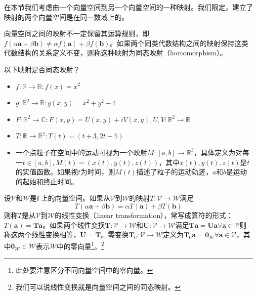 \documentclass[main.tex]{subfiles}
\begin{document}
在本节我们考虑由一个向量空间到另一个向量空间的一种映射。我们限定，建立了映射的两个向量空间是在同一数域上的。

向量空间之间的映射不一定保留其运算规则，即$f\left(\alpha\mathbf{a}+\beta\mathbf{b}\right)\neq\alpha f\left(\mathbf{a}\right)+\beta f\left(\mathbf{b}\right)$。如果两个同类代数结构之间的映射保持这类代数结构的关系定义不变，则称这种映射为同态映射（homomorphism）。
\begin{example}
以下映射是否同态映射？
\begin{itemize}
    \item $f:\mathbb{R}\rightarrow\mathbb{R}:f\left(x\right)=x^2$
    \item $g:\mathbb{R}^2\rightarrow\mathbb{R}:g\left(x,y\right)=x^2+y^2-4$
    \item $F:\mathbb{R}^2\rightarrow\mathbb{C}:F\left(x,y\right)=U\left(x,y\right)+iV\left(x,y\right),U,V:\mathbb{R}^2\rightarrow\mathbb{R}$
    \item $T:\mathbb{R}\rightarrow\mathbb{R}^2:T\left(t\right)=\left(t+3,2t-5\right)$
    \item 一个点粒子在空间中的运动可视为一个映射$M:\left[a,b\right]\rightarrow\mathbb{R}^3$，具体定义为对每一$t\in\left[a,b\right],M\left(t\right)=\left(x\left(t\right),y\left(t\right),z\left(t\right)\right)$，其中$x\left(t\right),y\left(t\right),z\left(t\right)$是$t$的实值函数。如果视$t$为时间，则$M\left(t\right)$描述了粒子的运动轨迹，$a$和$b$是运动的起始和终止时间。
\end{itemize}
\end{example}

\begin{definition}[线性变换]\label{def:II.4.1}
设$\mathcal{V}$和$\mathcal{W}$是$\mathbb{F}$上的向量空间。如果从$\mathcal{V}$到$\mathcal{W}$的映射$T:\mathcal{V}\rightarrow\mathcal{W}$满足
\[T\left(\alpha\mathbf{a}+\beta\mathbf{b}\right)=\alpha T\left(\mathbf{a}\right)+\beta T\left(\mathbf{b}\right)\]
则称$T$是从$\mathcal{V}$到$\mathcal{W}$的线性变换（linear transformation），常写成算符的形式：$T\left(\mathbf{a}\right)=\mathbf{Ta}$。如果两个线性变换$\mathbf{T}:\mathcal{V}\rightarrow\mathcal{W}$和$\mathbf{U}:\mathcal{V}\rightarrow\mathcal{W}$满足$\mathbf{Ta}=\mathbf{Ua}\forall\mathbf{a}\in\mathcal{V}$则称这两个线性变换相等，$\mathbf{U}=\mathbf{T}$。零变换$\mathbf{T}_0:\mathcal{V}\rightarrow\mathcal{W}$定义为$\mathbf{T}_0\mathbf{a}=\mathbf{0}_\mathcal{W}\forall\mathbf{a}\in\mathcal{V}$，其中$\mathbf{0}_\mathcal{W}\in\mathcal{W}$表示$\mathcal{W}$中的零向量\footnote{此处要注意区分不同向量空间中的零向量。}。\footnote{我们可以说线性变换就是向量空间之间的同态映射。}
\end{definition}
\end{document}
